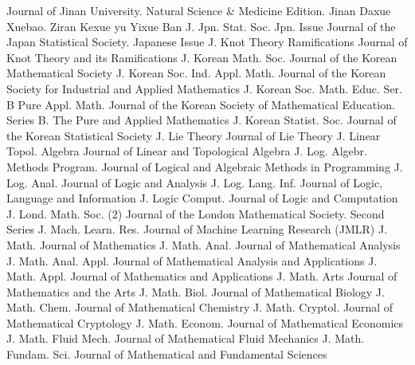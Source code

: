 {Journal of Jinan University. Natural Science & Medicine Edition. Jinan Daxue Xuebao. Ziran Kexue yu Yixue Ban}
{J. Jpn. Stat. Soc. Jpn. Issue}
{Journal of the Japan Statistical Society. Japanese Issue}
{J. Knot Theory Ramifications}
{Journal of Knot Theory and its Ramifications}
{J. Korean Math. Soc.}
{Journal of the Korean Mathematical Society}
{J. Korean Soc. Ind. Appl. Math.}
{Journal of the Korean Society for Industrial and Applied Mathematics}
{J. Korean Soc. Math. Educ. Ser. B Pure Appl. Math.}
{Journal of the Korean Society of Mathematical Education. Series B. The Pure and Applied Mathematics}
{J. Korean Statist. Soc.}
{Journal of the Korean Statistical Society}
{J. Lie Theory}
{Journal of Lie Theory}
{J. Linear Topol. Algebra}
{Journal of Linear and Topological Algebra}
{J. Log. Algebr. Methods Program.}
{Journal of Logical and Algebraic Methods in Programming}
{J. Log. Anal.}
{Journal of Logic and Analysis}
{J. Log. Lang. Inf.}
{Journal of Logic, Language and Information}
{J. Logic Comput.}
{Journal of Logic and Computation}
{J. Lond. Math. Soc. (2)}
{Journal of the London Mathematical Society. Second Series}
{J. Mach. Learn. Res.}
{Journal of Machine Learning Research (JMLR)}
{J. Math.}
{Journal of Mathematics}
{J. Math. Anal.}
{Journal of Mathematical Analysis}
{J. Math. Anal. Appl.}
{Journal of Mathematical Analysis and Applications}
{J. Math. Appl.}
{Journal of Mathematics and Applications}
{J. Math. Arts}
{Journal of Mathematics and the Arts}
{J. Math. Biol.}
{Journal of Mathematical Biology}
{J. Math. Chem.}
{Journal of Mathematical Chemistry}
{J. Math. Cryptol.}
{Journal of Mathematical Cryptology}
{J. Math. Econom.}
{Journal of Mathematical Economics}
{J. Math. Fluid Mech.}
{Journal of Mathematical Fluid Mechanics}
{J. Math. Fundam. Sci.}
{Journal of Mathematical and Fundamental Sciences}
